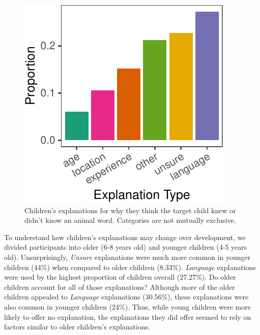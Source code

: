 \documentclass[10pt, letterpaper]{article}
\newenvironment{CodeChunk}{}{}
\begin{document}
\begin{CodeChunk}
\begin{figure}[tb]

{\centering \includegraphics{figs/explanations-1} 

}

\caption[Children's explanations for why they think the target child knew or didn't know an animal word]{Children's explanations for why they think the target child knew or didn't know an animal word. Categories are not mutually exclusive.}\label{fig:explanations}
\end{figure}
\end{CodeChunk}

To understand how children's explanations may change over development,
we divided participants into older (6-8 years old) and younger children
(4-5 years old). Unsurprisingly, \emph{Unsure} explanations were much
more common in younger children (44\%) when compared to older children
(8.33\%). \emph{Language} explanations were used by the highest
proportion of children overall (27.27\%). Do older children account for
all of those explanations? Although more of the older children appealed
to \emph{Language} explanations (30.56\%), these explanations were also
common in younger children (24\%). Thus, while young children were more
likely to offer no explanation, the explanations they did offer seemed
to rely on factors similar to older children's explanations.
\end{document}
